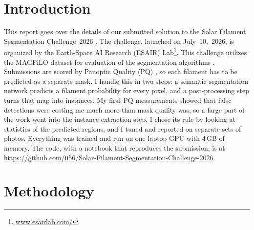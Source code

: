 \documentclass[sigconf]{acmart}
\newcommand{\repourl}{\url{https://github.com/ii56/Solar-Filament-Segmentation-Challenge-2026}}
\begin{document}
\section{Introduction}
    This report goes over the details of our submitted solution to the Solar Filament Segmentation Challenge~2026 \cite{filament-segmentation-2026}. The challenge, launched on July~10,~2026, is organized by the Earth-Space AI Research (ESAIR) Lab\footnote{\href{https://www.esairlab.com/home}{www.esairlab.com/}}. This challenge utilizes the MAGFiLO dataset for evaluation of the segmentation algorithms \cite{ahmadzadeh2024dataset}.
    Submissions are scored by Panoptic Quality (PQ) \cite{kirillov2019panoptic}, so each filament has to be predicted as a separate mask. I handle this in two steps: a semantic segmentation network predicts a filament probability for every pixel, and a post-processing step turns that map into instances. My first PQ measurements showed that false detections were costing me much more than mask quality was, so a large part of the work went into the instance extraction step. I chose its rule by looking at statistics of the predicted regions, and I tuned and reported on separate sets of photos. Everything was trained and run on one laptop GPU with 4\,GB of memory. The code, with a notebook that reproduces the submission, is at \repourl.


\section{Methodology}\label{sec:methodology}
\end{document}
